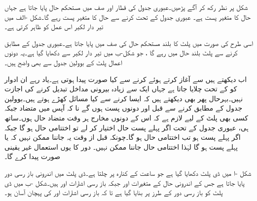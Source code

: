 شکل    پر نظر رکھ کر آگے پڑھیں۔عبوری جدول کی  قطار اور  صف میں مستحکم حال پایا جاتا ہے جہاں حال کا متغیر پست  ہے۔ عبوری جدول کے تحت  کرنے سے حال کا متغیر پست رہے گا۔شکل -الف میں تیر دار لکیر اس عمل کو ظاہر کرتی ہے۔

اسی طرح  کی صورت میں پلٹ کا  بلند مستحکم حال  کی صف میں پایا جاتا ہے۔عبوری جدول کے مطابق  کرنے سے پلٹ بلند حال میں رہے گا  ، جو شکل-ب   میں تیر دار لکیر سے دکھایا گیا ہے۔یہ دونوں اعمال پلٹ کے بوولین جدول سے بھی واضح ہیں۔

اب دیکھتے ہیں  سے آغاز کرتے ہوئے  کرنے سے کیا صورت پیدا ہوتی ہے۔یاد رہے ان ادوار کو کے تحت چلایا جاتا ہے جہاں ایک سے زیادہ بیرونی مداخل تبدیل کرنے کی اجازت نہیں۔بہرحال پھر بھی دیکھتے ہیں کہ ایسا کرنے سے کیا مسائل کھڑے ہوتے ہیں۔بوولین جدول کے مطابق کرنے سے قبل  اور  دونوں پست ہوں گے نا کہ آپس میں متضاد جبکہ کسی بھی پلٹ کے لیے لازم ہے کہ اس کے دونوں مخارج ہر وقت متضاد حال ہوں۔ساتھ ہی، عبوری جدول کے تحت اگر پہلے پست حال اختیار کر لے تو اختتامی حال  ہو گا جبکہ اگر  پہلے پست ہو تب اختتامی حال  ہو گا۔چونکہ قبل از وقت یہ جاننا ممکن نہیں کہ  یا  پہلے پست ہو گا لہٰذا اختتامی حال جاننا ممکن نہیں۔ دور کا یوں استعمال غیر یقینی صورت پیدا کرے گا۔


شکل   -ا میں   ڈی پلٹ دکھایا گیا ہے جو ساعت کے کنارہ پر چلتا ہے۔ڈی پلٹ میں اندرونی باز رسی دور پایا جاتا ہے جس کے اندرونی حال کے متغیرات  اور  جبکہ باز رسی اشارات  اور  ہیں۔شکل -ب میں ڈی پلٹ کو باز رسی دور کے طرز پر بنایا گیا ہے تا کہ باز رسی اشارات  اور  کی پہچان آسان ہو۔

